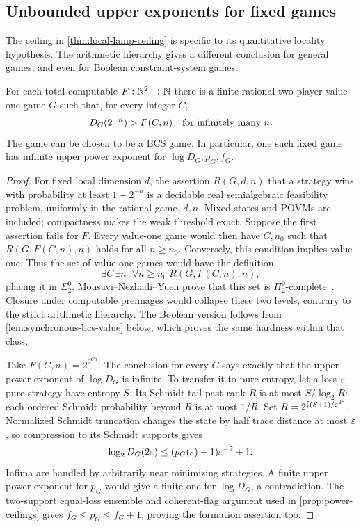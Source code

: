 \subsection{Unbounded upper exponents for fixed games}\label{sec:unbounded-power}
The ceiling in \cref{thm:local-lamp-ceiling} is specific to its quantitative locality hypothesis. The arithmetic hierarchy gives a different conclusion for general games, and even for Boolean constraint-system games.

\begin{theorem}\label{thm:unbounded-power}
For each total computable $F:\mathbb N^2\to\mathbb N$ there is a finite rational two-player value-one game $G$ such that, for every integer $C$, 
\[
 D_G(2^{-n})>F(C,n)\quad\hbox{for infinitely many }n.
\]
The game can be chosen to be a BCS game. In particular, one such fixed game has infinite upper power exponent for $\log D_G,p_G,f_G$.
\end{theorem}
\begin{proof}
For fixed local dimension $d$, the assertion $R(G,d,n)$ that a strategy wins with probability at least $1-2^{-n}$ is a decidable real semialgebraic feasibility problem, uniformly in the rational game, $d,n$. Mixed states and POVMs are included; compactness makes the weak threshold exact. Suppose the first assertion fails for $F$. Every value-one game would then have $C,n_0$ such that $R(G,F(C,n),n)$ holds for all $n\ge n_0$. Conversely, this condition implies value one. Thus the set of value-one games would have the definition
\[
 \exists C\,\exists n_0\,\forall n\ge n_0\ R(G,F(C,n),n),
\]
placing it in $\Sigma^0_2$. Mousavi--Nezhadi--Yuen prove that this set is $\Pi^0_2$-complete~\cite[Theorem~1.1]{MNY22}. Closure under computable preimages would collapse these two levels, contrary to the strict arithmetic hierarchy. The Boolean version follows from \cref{lem:synchronous-bcs-value} below, which proves the same hardness within that class.

Take $F(C,n)=2^{2^{Cn}}$. The conclusion for every $C$ says exactly that the upper power exponent of $\log D_G$ is infinite. To transfer it to pure entropy, let a loss-$\varepsilon$ pure strategy have entropy $S$. Its Schmidt tail past rank $R$ is at most $S/\log_2R$: each ordered Schmidt probability beyond $R$ is at most $1/R$. Set $R=2^{\lceil(S+1)/\varepsilon^2\rceil}$. Normalized Schmidt truncation changes the state by half trace distance at most $\varepsilon$, so compression to its Schmidt supports gives
\[
 \log_2D_G(2\varepsilon)\le (p_G(\varepsilon)+1)\varepsilon^{-2}+1.
\]
Infima are handled by arbitrarily near minimizing strategies. A finite upper power exponent for $p_G$ would give a finite one for $\log D_G$, a contradiction. The two-support equal-loss ensemble and coherent-flag argument used in \cref{prop:power-ceilings} gives $f_G\le p_G\le f_G+1$, proving the formation assertion too.
\end{proof}

